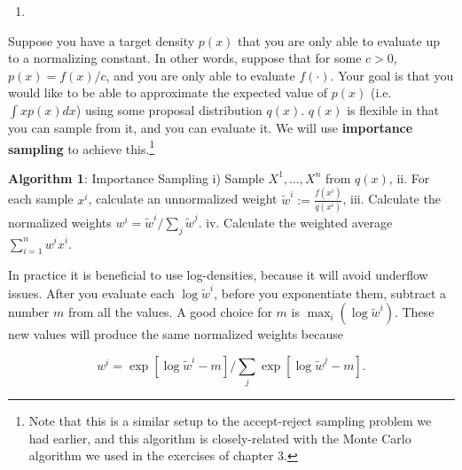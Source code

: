 \documentclass[12pt,krantz2]{krantz}
\begin{document}
\begin{enumerate}
\def\labelenumi{\arabic{enumi}.}
\setcounter{enumi}{9}
\item
\end{enumerate}

Suppose you have a target density \(p(x)\) that you are only able to evaluate up to a normalizing constant. In other words, suppose that for some \(c > 0\), \(p(x) = f(x) / c\), and you are only able to evaluate \(f(\cdot)\). Your goal is that you would like to be able to approximate the expected value of \(p(x)\) (i.e.~\(\int x p(x) dx\)) using some proposal distribution \(q(x)\). \(q(x)\) is flexible in that you can sample from it, and you can evaluate it. We will use \textbf{importance sampling} \citep{impsamping1} \citep{impsamping2} to achieve this.\footnote{Note that this is a similar setup to the accept-reject sampling problem we had earlier, and this algorithm is closely-related with the Monte Carlo algorithm we used in the exercises of chapter 3.}

\textbf{Algorithm 1}: Importance Sampling
i) Sample \(X^1, \ldots, X^n\) from \(q(x)\),
ii. For each sample \(x^i\), calculate an unnormalized weight \(\tilde{w}^i:= \frac{f(x^i)}{q(x^i)}\),
iii. Calculate the normalized weights \(w^i = \tilde{w}^i \bigg/ \sum_j \tilde{w}^j\).
iv. Calculate the weighted average \(\sum_{i=1}^n w^i x^i\).

In practice it is beneficial to use log-densities, because it will avoid underflow issues. After you evaluate each \(\log \tilde{w}^i\), before you exponentiate them, subtract a number \(m\) from all the values. A good choice for \(m\) is \(\max_i (\log \tilde{w}^i)\). These new values will produce the same normalized weights because

\begin{equation} 
w^i = \exp[ \log \tilde{w}^i - m] \bigg/ \sum_j \exp[\log \tilde{w}^j - m].
\end{equation}
\end{document}
